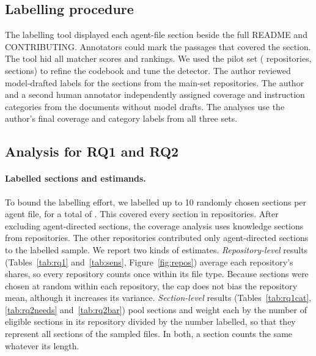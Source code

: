 \documentclass[sigconf,nonacm]{acmart}
\begin{document}
\subsection{Labelling procedure}\label{sec:labelling}

The labelling tool displayed each agent-file section beside the full README and CONTRIBUTING.
Annotators could mark the passages that covered the section. The tool hid all matcher scores and
rankings. We used the pilot set (\nPilotRepos{} repositories, \nPilotUnits{} sections) to refine
the codebook and tune the detector. The author reviewed model-drafted labels
for the sections from the main-set repositories. The author and a second human
annotator independently assigned coverage and instruction categories from the documents without
model drafts. The analyses use the author's final coverage and category labels from all three sets.




\subsection{Analysis for RQ1 and RQ2}\label{sec:analysis}

\paragraph{Labelled sections and estimands.} To bound the labelling effort, we labelled up to 10
randomly chosen sections per agent file, for a total of \nQueued{}. This covered every section in
\nFullyCodedRepos{} repositories. After excluding agent-directed sections, the coverage analysis
uses \nKnowledgeUnits{} knowledge sections from \nRepoKnowledge{} repositories. The other
\nReposNoKnowledge{} repositories contributed only agent-directed sections to the labelled sample.
We report two kinds of estimates. \emph{Repository-level} results (Tables~\ref{tab:rq1} and~\ref{tab:sens},
Figure~\ref{fig:repos}) average each repository's shares, so every repository counts once within its
file type. Because sections were chosen at random within each repository, the cap does not bias the
repository mean, although it increases its variance. \emph{Section-level} results
(Tables~\ref{tab:rq1cat}, \ref{tab:rq2needs} and~\ref{tab:rq2bar}) pool sections and weight each by
the number of eligible sections in its repository divided by the number labelled, so that they
represent all sections of the sampled files. In both, a section counts the same whatever its
length.
\end{document}
